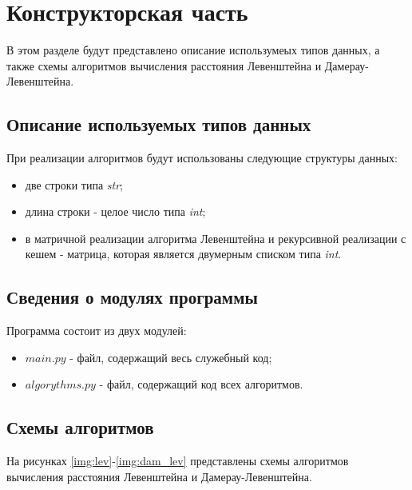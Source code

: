 \chapter{Конструкторская часть}
В этом разделе будут представлено описание использумеых типов данных, а также схемы алгоритмов вычисления расстояния Левенштейна и Дамерау-Левенштейна.

\section{Описание используемых типов данных}
При реализации алгоритмов будут использованы следующие структуры данных:

\begin{itemize}
    \item две строки типа \textit{str};
    \item длина строки - целое число типа \textit{int};
    \item в матричной реализации алгоритма Левенштейна и рекурсивной реализации с кешем - матрица, которая является двумерным списком типа \textit{int}. 
\end{itemize}


\section{Сведения о модулях программы}
Программа состоит из двух модулей:
\begin{itemize}
	\item $main.py$ - файл, содержащий весь служебный код;
    \item $algorythms.py$ - файл, содержащий код всех алгоритмов. \newline
\end{itemize}


\section{Схемы алгоритмов}
На рисунках \ref{img:lev}-\ref{img:dam_lev} представлены схемы алгоритмов вычисления расстояния Левенштейна и Дамерау-Левенштейна.


